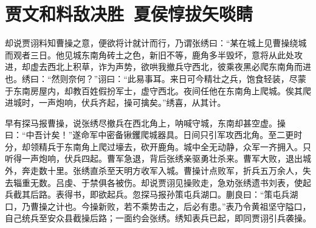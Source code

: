 \chapter{贾文和料敌决胜~夏侯惇拔矢啖睛}

却说贾诩料知曹操之意，便欲将计就计而行，乃谓张绣曰：“某在城上见曹操绕城而观者三日。他见城东南角砖土之色，新旧不等，鹿角多半毁坏，意将从此处攻进，却虚去西北上积草，诈为声势，欲哄我撤兵守西北，彼乘夜黑必爬东南角而进也。绣曰：“然则奈何？”诩曰：“此易事耳。来日可今精壮之兵，饱食轻装，尽蒙于东南房屋内，却教百姓假扮军士，虚守西北。夜间任他在东南角上爬城。俟其爬进城时，一声炮响，伏兵齐起，操可擒矣。”绣喜，从其计。

早有探马报曹操，说张绣尽撤兵在西北角上，呐喊守城，东南却甚空虚。操曰：“中吾计矣！”遂命军中密备锹钁爬城器具。日间只引军攻西北角。至二更时分，却领精兵于东南角上爬过壕去，砍开鹿角。城中全无动静，众军一齐拥入。只听得一声炮响，伏兵四起。曹军急退，背后张绣亲驱勇壮杀来。曹军大败，退出城外，奔走数十里。张绣直杀至天明方收军入城。曹操计点败军，折兵五万余人，失去辎重无数。吕虔、于禁俱各被伤。却说贾诩见操败走，急劝张绣遗书刘表，使起兵截其后路。表得书，即欲起兵。忽探马报孙策屯兵湖口。蒯良曰：“策屯兵湖口，乃曹操之计也。今操新败，若不乘势击之，后必有患。”表乃令黄祖坚守隘口，自己统兵至安众县截操后路；一面约会张绣。绣知表兵已起，即同贾诩引兵袭操。

